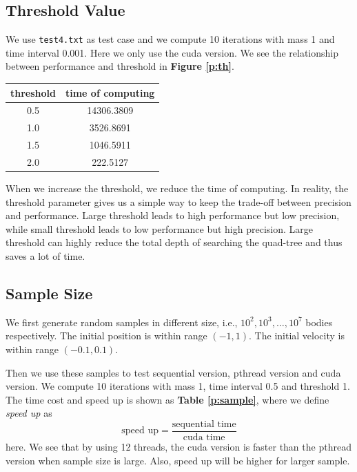 \documentclass[11pt, a4paper]{article}
\makeatletter
\newcommand\tcaption{\def\@captype{table}\caption}
\newcommand{\fref}[1]{\textbf{Figure \ref{#1}}}
\newcommand{\tref}[1]{\textbf{Table \ref{#1}}}
\makeatother
\begin{document}
\subsection{Threshold Value}

We use \texttt{test4.txt} as test case and we compute 10 iterations with mass 1 and time interval 0.001. Here we only use the cuda version. We see the relationship between performance and threshold in \fref{p:th}.

\begin{center}
    \tcaption{Performance on different threshold value}\label{p:th}
    \begin{tabular}{cc}
        \toprule
        threshold & time of computing \\
        \midrule
        0.5 & 14306.3809 \\
        1.0 & 3526.8691 \\
        1.5 & 1046.5911 \\
        2.0 & 222.5127 \\
    \bottomrule
    \end{tabular}
\end{center}

When we increase the threshold, we reduce the time of computing. In reality, the threshold parameter gives us a simple way to keep the trade-off between precision and performance. Large threshold leads to high performance but low precision, while small threshold leads to low performance but high precision. Large threshold can highly reduce the total depth of searching the quad-tree and thus saves a lot of time.

\subsection{Sample Size}

We first generate random samples in different size, i.e., $10^2, 10^3, \ldots, 10^7$ bodies respectively. The initial position is within range $(-1,1)$. The initial velocity is within range $(-0.1, 0.1)$.

Then we use these samples to test sequential version, pthread version and cuda version. We compute 10 iterations with mass 1, time interval 0.5 and threshold 1. The time cost and speed up is shown as \tref{p:sample}, where we define \textit{speed up} as
$$\mbox{speed up} = \frac{\mbox{sequential time}}{\mbox{cuda time}}$$
here. We see that by using 12 threads, the cuda version is faster than the pthread version when sample size is large. Also, speed up will be higher for larger sample.
\end{document}
